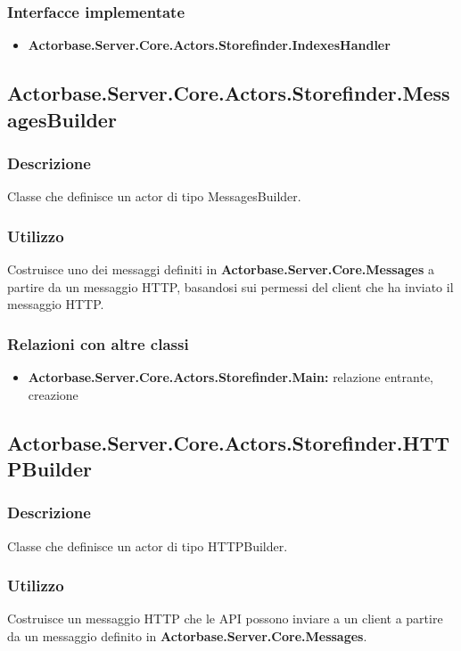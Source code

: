 \documentclass[a4paper]{article}
\begin{document}
			\subsubsection{Interfacce implementate}
			\begin{itemize}
				\item \textbf{Actorbase.Server.Core.Actors.Storefinder.IndexesHandler} 
			\end{itemize}

		\subsection{Actorbase.Server.Core.Actors.Storefinder.MessagesBuilder}
			\subsubsection{Descrizione}
				Classe che definisce un actor di tipo MessagesBuilder.
			\subsubsection{Utilizzo}
				Costruisce uno dei messaggi definiti in \textbf{Actorbase.Server.Core.Messages} a partire da un messaggio HTTP, basandosi sui permessi del client che ha inviato il messaggio HTTP.
			\subsubsection{Relazioni con altre classi}
			\begin{itemize}
				\item \textbf{Actorbase.Server.Core.Actors.Storefinder.Main:} relazione entrante, creazione
			\end{itemize}

		\subsection{Actorbase.Server.Core.Actors.Storefinder.HTTPBuilder}
			\subsubsection{Descrizione}
				Classe che definisce un actor di tipo HTTPBuilder.
			\subsubsection{Utilizzo}
				Costruisce un messaggio HTTP che le API possono inviare a un client a partire da un messaggio definito in \textbf{Actorbase.Server.Core.Messages}.
\end{document}
